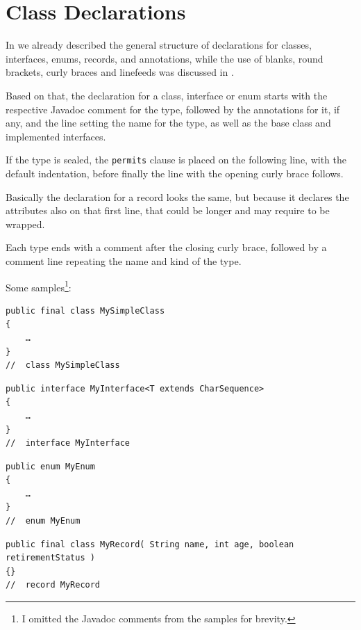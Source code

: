\section{Class Declarations}

In  we already described the general structure of declarations for \Java classes, interfaces, enums, records, and annotations, while the use of blanks, round brackets, curly braces and linefeeds was discussed in .

Based on that, the declaration for a class, interface or enum starts with the respective Javadoc comment for the type, followed by the annotations for it, if any, and the line setting the name for the type, as well as the base class and implemented interfaces.

If the type is sealed, the \lstinline|permits| clause is placed on the following line, with the default indentation, before finally the line with the opening curly brace follows.

Basically the declaration for a record looks the same, but because it declares the attributes also on that first line, that could be longer and may require to be wrapped.

Each type ends with a comment after the closing curly brace, followed by a comment line repeating the name and kind of the type.

Some samples\footnote{I omitted the Javadoc comments from the samples for brevity.}:
\begin{lstlisting}
public final class MySimpleClass
{
    …
}
//  class MySimpleClass
\end{lstlisting}

\begin{lstlisting}
public interface MyInterface<T extends CharSequence>
{
    …
}
//  interface MyInterface
\end{lstlisting}
 
\begin{lstlisting}
public enum MyEnum
{
    …
}
//  enum MyEnum
\end{lstlisting}

\begin{lstlisting}
public final class MyRecord( String name, int age, boolean retirementStatus )
{}
//  record MyRecord
\end{lstlisting}

